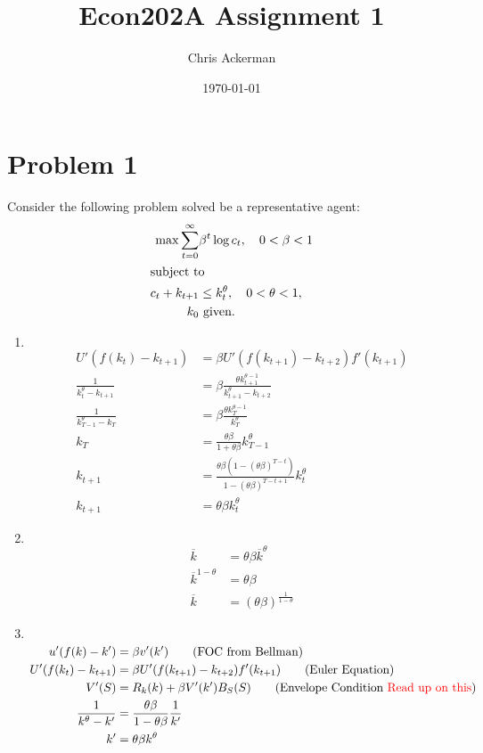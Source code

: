 \documentclass[11pt]{article}
\author{Chris Ackerman}
\date{\today}
\title{Econ202A Assignment 1}
\newcommand{\rd}{\textcolor{red}}
\begin{document}
\maketitle
\tableofcontents

\newpage
\section{Problem 1}
\label{sec:org9803f5a}
Consider the following problem solved be a representative agent:
  \begin{align*}
  \max \sum^\infty_{t = 0} &\beta^t \log c_t, \quad 0 < \beta < 1\\
\intertext{subject to}
c_t + k_{t + 1} &\le k^\theta_t, \quad 0 < \theta < 1,\\
k_0 &\text{ given.}
  \end{align*}
  \begin{enumerate}[label=(\alph*)]
    \item $ $
    \begin{align}
U'(f(k_t) - k_{t + 1}) &= \beta U' (f(k_{t + 1}) - k_{t + 2})f'(k_{t + 1}) \tag{Euler Equation}\\
\frac{1}{k^\theta_t - k_{t + 1}} &= \beta \frac{\theta k^{\theta - 1}_{t + 1}}{k^\theta_{t + 1} - k_{t + 2}}\\
\frac{1}{k^\theta_{T - 1} - k_T} &= \beta \frac{\theta k^{\theta - 1}_T}{k^\theta_T}\\
k_T &= \frac{\theta \beta}{1 + \theta \beta}k^\theta_{T - 1}\\
k_{t + 1} &= \frac{\theta \beta (1 - (\theta \beta)^{T - t})}{1 - (\theta \beta)^{T - t + 1}} k^\theta_t\\
k_{t + 1} &= \theta \beta k_{t}^\theta
\end{align}
    \item $ $ 
    \begin{align}
    \overline{k} &= \theta \beta \overline{k}^\theta\\
\overline{k}^{1 - \theta} &= \theta \beta\\
\overline{k} &= (\theta \beta)^{\frac{1}{1 - \theta}}
\end{align}
    \item $ $
    \begin{align}
    u'(f(k) - k') &= \beta v'(k')\tag{FOC from Bellman}\\
U'(f(k_t) - k_{t + 1}) &= \beta U' (f(k_{t + 1}) - k_{t + 2})f'(k_{t + 1}) \tag{Euler Equation}\\
V'(S) &= R_k (k) + \beta V'(k') B_S(S) \tag{Envelope Condition \rd{Read up on this}}\\
\frac{1}{k^\theta - k'} &= \frac{\theta \beta}{1 - \theta \beta}\frac{1}{k'}\\
k' &= \theta \beta k^\theta
    \end{align}
  \end{enumerate}
\end{document}
